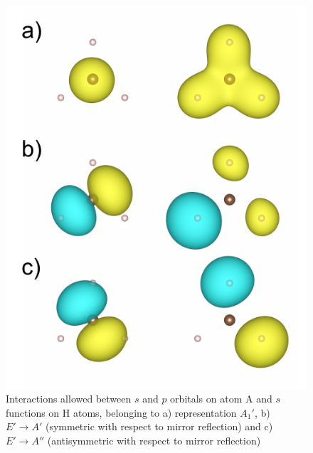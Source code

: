 \documentclass{article}
\begin{document}
\begin{figure}[h!]
    \centering
    \includegraphics{../figures/AH3_MO.pdf}
    \caption{Interactions allowed between $s$ and $p$ orbitals on atom A and $s$ functions on H atoms,
        belonging to a) representation $A_1'$, b) $E' \to A'$ (symmetric with respect to mirror reflection)
        and c) $E'\to A''$ (antisymmetric with respect to mirror reflection) }
    \label{F:AH3_MO}
\end{figure}
\end{document}
